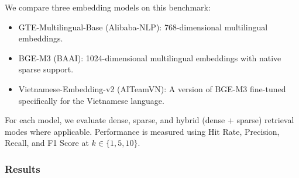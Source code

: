 \documentclass[letterpaper]{article} %
\begin{document}
We compare three embedding models on this benchmark:
\begin{itemize}
    \item GTE-Multilingual-Base (Alibaba-NLP): 768-dimensional multilingual embeddings.
    \item BGE-M3 (BAAI): 1024-dimensional multilingual embeddings with native sparse support.
    \item Vietnamese-Embedding-v2 (AITeamVN): A version of BGE-M3 fine-tuned specifically for the Vietnamese language.
\end{itemize}

For each model, we evaluate dense, sparse, and hybrid (dense + sparse) retrieval modes where applicable. Performance is measured using Hit Rate, Precision, Recall, and F1 Score at $k \in \{1, 5, 10\}$.

\subsubsection{Results}
\end{document}
